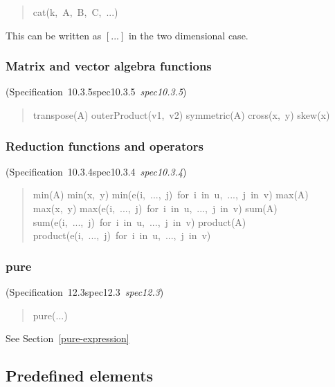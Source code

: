 \documentclass[10pt,b5paper]{article}
\def\specrefx#1#2{Specification~#1\ifx\relax#2\relax{}\else~{\it{}#2}\fi}
\def\specref#1{\specrefx{#1}{\csname spec#1\endcsname}}
\begin{document}
\begin{quote}\widespacing
cat(k,~A,~B,~C,~...)
\end{quote}

\noindent This can be written as $[...]$ in the two dimensional
case.


\subsubsection*{Matrix and vector algebra functions}
(\specref{10.3.5}\/)

\begin{quote}\widespacing
transpose(A)
outerProduct(v1,~v2)
symmetric(A)
cross(x,~y)
skew(x)
\end{quote}

\subsubsection*{Reduction functions and operators}
(\specref{10.3.4}\/)

\begin{quote}\widespacing

min(A)
min(x,~y)
min(e(i,~...,~j)~for~i~in~u,~...,~j~in~v)
max(A)
max(x,~y)
max(e(i,~...,~j)~for~i~in~u,~...,~j~in~v)
sum(A)
sum(e(i,~...,~j)~for~i~in~u,~...,~j~in~v)
product(A)
product(e(i,~...,~j)~for~i~in~u,~...,~j~in~v)

\end{quote}

\subsubsection*{pure}
(\specref{12.3}\/)

\begin{quote}\widespacing
pure(...)
\end{quote}

\noindent See Section~\ref{pure-expression}


\subsection{Predefined elements}
\end{document}
